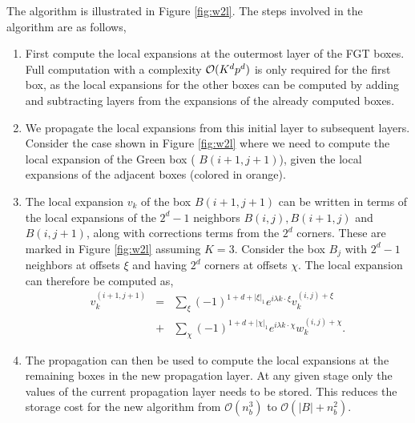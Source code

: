 The algorithm is illustrated in Figure \ref{fig:w2l}. The steps involved in the
algorithm are as follows, 
\begin{enumerate}    
  \item First compute the local expansions at the outermost layer of the FGT
    boxes. Full computation with a complexity $\mathcal{O}(K^d p^d)$ is only required for the first box, as
    the local expansions for the other boxes can be computed by adding and
    subtracting layers from the expansions of the already computed boxes. 
  
  \item We propagate the local expansions from this initial layer to subsequent
    layers. Consider the case shown in Figure \ref{fig:w2l} where we need to
    compute the local expansion of the Green box ( $B(i+1,j+1)$), given the
    local expansions of the adjacent boxes (colored in orange).  
  
  \item The local expansion $v_k$ of the box $B(i+1, j+1)$ can be written in terms of the
    local expansions of the $2^d -1$ neighbors $B(i,j), B(i+1,j)$ and
    $B(i,j+1)$, along with corrections terms from the $2^d$ corners.
    These are marked in Figure \ref{fig:w2l} assuming $K=3$. Consider the box $B_j$ with $2^d -1$ neighbors at offsets $\xi$ and having $2^d$ corners at offsets $\chi$. The local expansion can therefore be computed as,
    \begin{eqnarray} 
    v_k^{(i+1,j+1)} &=& \sum_{\xi} (-1)^{1 + d + |\xi|_1} e^{i\lambda k\cdot\xi} v_k^{(i,j)+\xi} \nonumber\\
    & +& \sum_{\chi} (-1)^{1 + d + |\chi|_1} e^{i\lambda k\cdot \chi} w_k^{(i,j)+\chi}. \label{eqn:sweep}
    \end{eqnarray}
    
  
  \item The propagation can then be used to compute the local expansions at the remaining boxes in
    the new propagation layer. At any given stage only the values of the current 
    propagation layer needs to be stored. This reduces the storage cost for the new algorithm from
    $\mathcal{O}(n_b^3)$ to $\mathcal{O}(|B| + n_b^2)$.

\end{enumerate}

